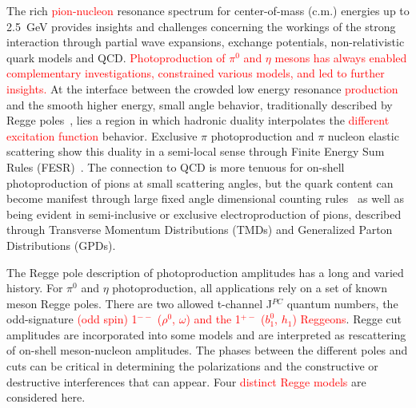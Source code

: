 \documentclass[aps,prc,twocolumn,floatfix,showpacs,preprintnumbers,amsmath,amssymb,superscriptaddress,linenumbers]{revtex4-1}
\begin{document}
The rich \textcolor{red}{pion-nucleon} resonance spectrum for center-of-mass 
(c.m.) energies up to 2.5~GeV provides insights and challenges concerning 
the workings of the strong interaction through partial wave expansions, 
exchange potentials, non-relativistic quark models and QCD. \textcolor{red}{Photoproduction of $\pi^0$ and $\eta$ mesons has always enabled complementary investigations, constrained various models, and led to further insights.} At the interface between the crowded low energy resonance 
\textcolor{red}{production} and the smooth higher energy, small angle behavior, 
traditionally described by Regge poles~\cite{Ader:1967tqj}, lies a 
region in which hadronic duality interpolates the \textcolor{red}{different excitation function}
behavior. Exclusive $\pi$ photoproduction and $\pi$ nucleon elastic 
scattering show this duality in a semi-local sense through Finite Energy 
Sum Rules (FESR)~\cite{Armenian:1974xd}. The connection to QCD is more 
tenuous for on-shell photoproduction of pions at small scattering angles, 
but the quark content can become manifest through large fixed angle 
dimensional counting rules~\cite{Brodsky:1973kr} as well as being evident 
in semi-inclusive or exclusive electroproduction of pions, described 
through Transverse Momentum Distributions (TMDs)  and Generalized Parton 
Distributions (GPDs).


The Regge pole description of photoproduction amplitudes 
has a long and varied history. For $\pi^0$ and $\eta$ photoproduction, 
all applications rely on a set of known meson Regge poles. There are 
two allowed t-channel J$^{PC}$ quantum numbers, the odd-signature \textcolor{red}{(odd spin) 
1$^{--}$ ($\rho^0$, $\omega$) and the 1$^{+-}$ ($b^0_1$, $h_1$) Reggeons}. Regge cut amplitudes are 
incorporated into some models and are interpreted as rescattering of 
on-shell meson-nucleon amplitudes.  The phases between the different 
poles and cuts can be critical in determining the polarizations and the 
constructive or destructive interferences that can appear. Four \textcolor{red}{distinct Regge models} 
are considered here.
\end{document}
